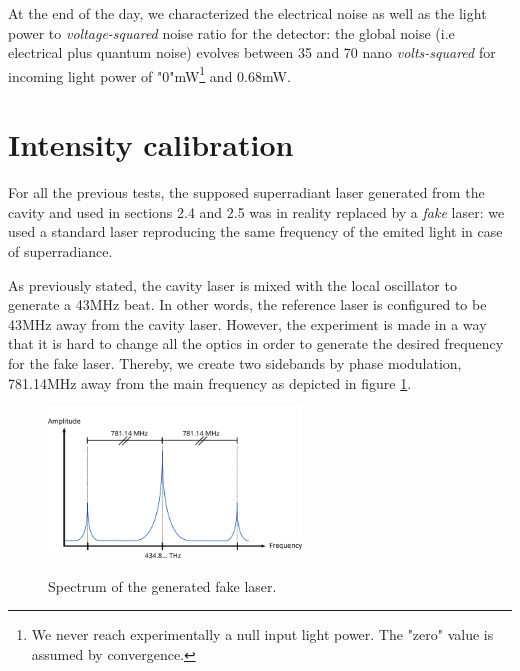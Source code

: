\documentclass[11pt]{report}
\begin{document}
At the end of the day, we characterized the electrical noise as well as the light power to \textit{voltage-squared} noise ratio for the detector: the global noise (i.e electrical plus quantum noise) evolves between 35 and 70 nano \textit{volts-squared} for incoming light power of "0"mW\footnote{We never reach experimentally a null input light power. The "zero" value is assumed by convergence.} and 0.68mW.

\section{Intensity calibration}

For all the previous tests, the supposed superradiant laser generated from the cavity and used in sections 2.4 and 2.5 was in reality replaced by a \textit{fake} laser: we used a standard laser reproducing the same frequency of the emited light in case of superradiance.

As previously stated, the cavity laser is mixed with the local oscillator to generate a 43MHz beat. In other words, the reference laser is configured to be 43MHz away from the cavity laser. However, the experiment is made in a way that it is hard to change all the optics in order to generate the desired frequency for the fake laser. Thereby, we create two sidebands by phase modulation, 781.14MHz away from the main frequency as depicted in figure \ref{fig:sb-def}.

\begin{figure}[h!]
\caption{Spectrum of the generated fake laser.}
\centering
\includegraphics[width=0.6\textwidth]{sb-def}
\label{fig:sb-def}
\end{figure}
\end{document}
